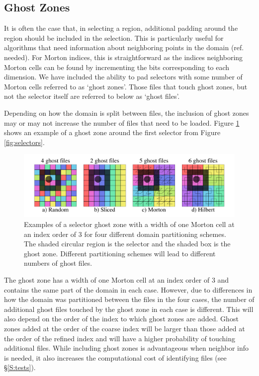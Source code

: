 \documentclass[apjl]{emulateapj}
\newcommand{\addref}{{\color{red}(ref. needed)}}
\begin{document}
\subsection{Ghost Zones}
It is often the case that, in selecting a region, additional padding around the region should be included in the selection. This is particularly useful for algorithms that need information about neighboring points in the domain \addref. For Morton indices, this is straightforward as the indices neighboring Morton cells can be found by incrementing the bits corresponding to each dimension. We have included the ability to pad selectors with some number of Morton cells referred to as `ghost zones'. Those files that touch ghost zones, but not the selector itself are referred to below as `ghost files'. 

Depending on how the domain is split between files, the inclusion of ghost zones may or may not increase the number of files that need to be loaded. Figure \ref{fig:ghosts} shows an example of a ghost zone around the first selector from Figure \ref{fig:selectors}. 
%
\begin{figure}[htbp]
\begin{center}
\includegraphics[width=\columnwidth,keepaspectratio]{../images/ghosts.png}
\caption{Examples of a selector ghost zone with a width of one Morton cell at an index order of 3 for  four different domain partitioning schemes. The shaded circular region is the selector and the shaded box is the ghost zone. Different partitioning schemes will lead to different numbers of ghost files.}
\label{fig:ghosts}
\end{center}
\end{figure}
%
The ghost zone has a width of one Morton cell at an index order of 3 and contains the same part of the domain in each case. However, due to differences in how the domain was partitioned between the files in the four cases, the number of additional ghost files touched by the ghost zone in each case is different. This will also depend on the order of the index to which ghost zones are added. Ghost zones added at the order of the coarse index will be larger than those added at the order of the refined index and will have a higher probability of touching additional files. While including ghost zones is advantageous when neighbor info is needed, it also increases the computational cost of identifying files (see \S\ref{S:tests}). 
\end{document}
